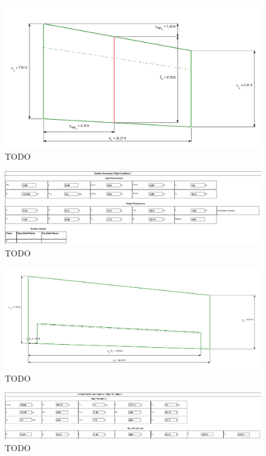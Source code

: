 \documentclass[conf]{new-aiaa}
\begin{document}
\begin{figure}
    \includegraphics[width=\textwidth]{Report3Printouts/Empannage/Vertical_geometry_plot.png}
    \caption{TODO}
    \label{fig:TODO}
\end{figure}


\begin{figure}
    \includegraphics[width=\textwidth]{Report3Printouts/Empannage/Vertical_rudder_cropped.png}
    \caption{TODO}
    \label{fig:TODO}
\end{figure}

\begin{figure}
    \includegraphics[width=\textwidth]{Report3Printouts/Empannage/Vertical_rudder_plot.png}
    \caption{TODO}
    \label{fig:TODO}
\end{figure}


\begin{figure}
    \includegraphics[width=\textwidth]{Report3Printouts/Empannage/Vertical_volumeratio_cropped.png}
    \caption{TODO}
    \label{fig:TODO}
\end{figure}
\end{document}
